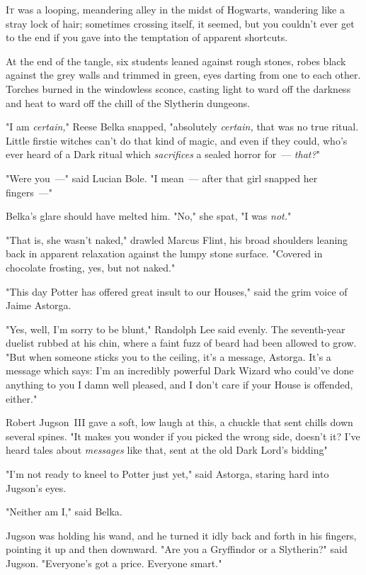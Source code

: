 
\lettrine{I}{t} was a looping,
meandering alley in the midst of Hogwarts, wandering like a stray lock of hair;
sometimes crossing itself, it seemed, but you couldn't ever get to the end if
you gave into the temptation of apparent shortcuts.

At the end of the tangle, six students leaned against rough stones, robes black
against the grey walls and trimmed in green, eyes darting from one to each
other. Torches burned in the windowless sconce, casting light to ward off the
darkness and heat to ward off the chill of the Slytherin dungeons.

"I am \emph{certain,}" Reese Belka snapped, "absolutely \emph{certain,} that
was no true ritual. Little firstie witches can't do that kind of magic, and
even if they could, who's ever heard of a Dark ritual which \emph{sacrifices} a
sealed horror for~--- \emph{that?}"

"Were you~---" said Lucian Bole. "I mean~--- after that girl snapped her
fingers~---"

Belka's glare should have melted him. "No," she spat, "I was \emph{not.}"

"That is, she wasn't naked," drawled Marcus Flint, his broad shoulders leaning
back in apparent relaxation against the lumpy stone surface. "Covered in
chocolate frosting, yes, but not naked."

"This day Potter has offered great insult to our Houses," said the grim voice
of Jaime Astorga.

"Yes, well, I'm sorry to be blunt," Randolph Lee said evenly. The seventh-year
duelist rubbed at his chin, where a faint fuzz of beard had been allowed to
grow. "But when someone sticks you to the ceiling, it's a message, Astorga.
It's a message which says: I'm an incredibly powerful Dark Wizard who could've
done anything to you I damn well pleased, and I don't care if your House is
offended, either."

Robert Jugson~III gave a soft, low laugh at this, a chuckle that sent chills
down several spines. "It makes you wonder if you picked the wrong side, doesn't
it? I've heard tales about \emph{messages} like that, sent at the old Dark
Lord's bidding{\el}"

"I'm not ready to kneel to Potter just yet," said Astorga, staring hard into
Jugson's eyes.

"Neither am I," said Belka.

Jugson was holding his wand, and he turned it idly back and forth in his
fingers, pointing it up and then downward. "Are you a Gryffindor or a
Slytherin?" said Jugson. "Everyone's got a price. Everyone smart."

